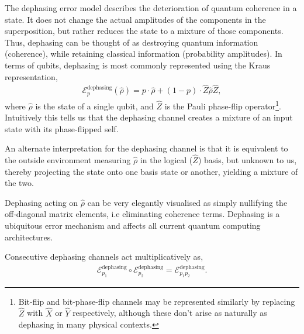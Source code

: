 The dephasing error model describes the deterioration of quantum coherence in a state. It does not change the actual amplitudes of the components in the superposition, but rather reduces the state to a mixture of those components. Thus, dephasing can be thought of as destroying quantum information (coherence), while retaining classical information (probability amplitudes). In terms of qubits, dephasing is most commonly represented using the Kraus representation,
\begin{align} \label{eq:dephasing_channel}
\mathcal{E}_p^\text{dephasing}(\hat\rho) = p\cdot\hat\rho + (1-p)\cdot \hat{Z}\hat\rho\hat{Z},
\end{align}
where $\hat\rho$ is the state of a single qubit, and $\hat{Z}$ is the Pauli phase-flip operator\footnote{Bit-flip and bit-phase-flip channels may be represented similarly by replacing $\hat{Z}$ with $\hat{X}$ or $\hat{Y}$ respectively, although these don't arise as naturally as dephasing in many physical contexts.}. Intuitively this tells us that the dephasing channel creates a mixture of an input state with its phase-flipped self.

An alternate interpretation for the dephasing channel is that it is equivalent to the outside environment measuring $\hat\rho$ in the logical ($\hat{Z}$) basis, but unknown to us, thereby projecting the state onto one basis state or another, yielding a mixture of the two.

Dephasing acting on $\hat\rho$ can be very elegantly visualised as simply nullifying the off-diagonal matrix elements, i.e eliminating coherence terms. Dephasing is a ubiquitous error mechanism and affects all current quantum computing architectures.

Consecutive dephasing channels act multiplicatively as,
\begin{align} \label{eq:multi_deph}
\mathcal{E}_{p_1}^\text{dephasing} \circ \mathcal{E}_{p_2}^\text{dephasing} = \mathcal{E}_{p_1 p_2}^\text{dephasing}.
\end{align}

